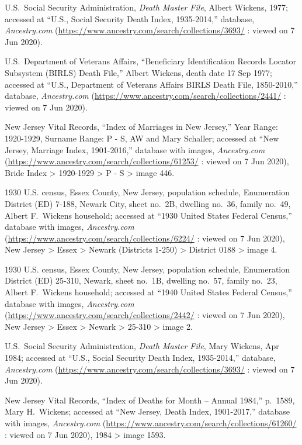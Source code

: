\begin{thebibliography}{999}
U.S.\ Social Security Administration, \textit{Death Master File}, Albert Wickens, 1977; accessed at ``U.S., Social Security Death Index, 1935-2014,'' database, \textit{Ancestry.com} (\url{https://www.ancestry.com/search/collections/3693/} : viewed on 7 Jun 2020).

U.S.\ Department of Veterans Affairs, ``Beneficiary Identification Records Locator Subsystem (BIRLS) Death File,'' Albert Wickens, death date 17 Sep 1977; accessed at ``U.S., Department of Veterans Affairs BIRLS Death File, 1850-2010,'' database, \textit{Ancestry.com} (\url{https://www.ancestry.com/search/collections/2441/} : viewed on 7 Jun 2020).

New Jersey Vital Records, ``Index of Marriages in New Jersey,'' Year Range: 1920-1929, Surname Range: P - S, AW and Mary Schaller; accessed at ``New Jersey, Marriage Index, 1901-2016,'' database with images, \textit{Ancestry.com} (\url{https://www.ancestry.com/search/collections/61253/} : viewed on 7 Jun 2020), Bride Index > 1920-1929 > P - S > image 446.

1930 U.S. census, Essex County, New Jersey, population schedule, Enumeration District (ED) 7-188, Newark City, sheet no.\ 2B, dwelling no.\ 36, family no.\ 49, Albert F.\ Wickens household; accessed at ``1930 United States Federal Census,'' database with images, \textit{Ancestry.com} (\url{https://www.ancestry.com/search/collections/6224/} : viewed on 7 Jun 2020), New Jersey > Essex > Newark (Districts 1-250) > District 0188 > image 4.

1930 U.S. census, Essex County, New Jersey, population schedule, Enumeration District (ED) 25-310, Newark, sheet no.\ 1B, dwelling no.\ 57, family no.\ 23, Albert F.\ Wickens household; accessed at ``1940 United States Federal Census,'' database with images, \textit{Ancestry.com} (\url{https://www.ancestry.com/search/collections/2442/} : viewed on 7 Jun 2020), New Jersey > Essex > Newark > 25-310 > image 2.

U.S.\ Social Security Administration, \textit{Death Master File}, Mary Wickens, Apr 1984; accessed at ``U.S., Social Security Death Index, 1935-2014,'' database, \textit{Ancestry.com} (\url{https://www.ancestry.com/search/collections/3693/} : viewed on 7 Jun 2020).

New Jersey Vital Records, ``Index of Deaths for Month -- Annual 1984,'' p.\ 1589, Mary H.\ Wickens; accessed at ``New Jersey, Death Index, 1901-2017,'' database with images, \textit{Ancestry.com} (\url{https://www.ancestry.com/search/collections/61260/} : viewed on 7 Jun 2020), 1984 > image 1593.


\end{thebibliography}
